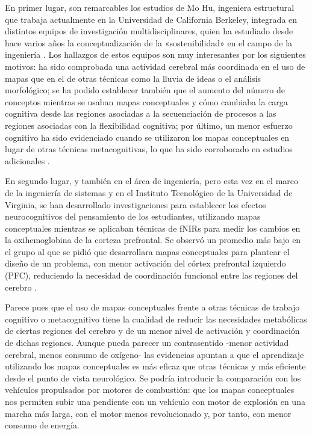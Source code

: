 \documentclass[spanish]{textolivre}
\begin{document}
En primer lugar, son remarcables los estudios de Mo Hu, ingeniera estructural que trabaja actualmente en la Universidad de California Berkeley, integrada en distintos equipos de investigación multidisciplinares, quien ha estudiado desde hace varios años la conceptualización de la «sostenibilidad» en el campo de la ingeniería \cite{colgan_pkc_2018,hu2018neuroscience,shealy2017evaluating,hu2019empirical}. %
Los hallazgos de estos equipos son muy interesantes por los siguientes motivos: ha sido comprobada una actividad cerebral más coordinada en el uso de mapas que en el de otras técnicas como la lluvia de ideas o el análisis morfológico; se ha podido establecer también que el aumento del número de conceptos mientras se usaban mapas conceptuales y cómo cambiaba la carga cognitiva desde las regiones asociadas a la secuenciación de procesos a las regiones asociadas con la flexibilidad cognitiva; por último, un menor esfuerzo cognitivo ha sido evidenciado cuando se utilizaron los mapas conceptuales en lugar de otras técnicas metacognitivas, lo que ha sido corroborado en estudios adicionales \cite{hu2019empirical}. %

En segundo lugar, y también en el área de ingeniería, pero esta vez en el marco de la ingeniería de sistemas y en el Instituto Tecnológico de la Universidad de Virginia, se han desarrollado investigaciones para establecer los efectos neurocognitivos del pensamiento de los estudiantes, utilizando mapas conceptuales mientras se aplicaban técnicas de fNIRs para medir los cambios en la oxihemoglobina de la corteza prefrontal. Se observó un promedio más bajo en el grupo al que se pidió que desarrollara mapas conceptuales para plantear el diseño de un problema, con menor activación del córtex prefrontal izquierdo (PFC), reduciendo la necesidad de coordinación funcional entre las regiones del cerebro \cite{manandhar2022effects}. %

Parece pues que el uso de mapas conceptuales frente a otras técnicas de trabajo cognitivo o metacognitivo tiene la cualidad de reducir las necesidades metabólicas de ciertas regiones del cerebro y de un menor nivel de activación y coordinación de dichas regiones. Aunque pueda parecer un contrasentido -menor actividad cerebral, menos consumo de oxígeno- las evidencias apuntan a que el aprendizaje utilizando los mapas conceptuales es más eficaz que otras técnicas y más eficiente desde el punto de vista neurológico. Se podría introducir la comparación con los vehículos propulsados por motores de combustión: que los mapas conceptuales nos permiten subir una pendiente con un vehículo con motor de explosión en una marcha más larga, con el motor menos revolucionado y, por tanto, con menor consumo de energía.
\end{document}
